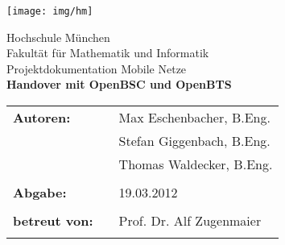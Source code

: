%
\begin{titlepage}
\begin{flushright}
\texttt{[image: img/hm]}%
\end{flushright}

\vspace*{20mm}
\begin{center}
{\Large Hochschule München}\\
{\large Fakultät für Mathematik und Informatik}\\

\vspace*{15mm}
{\huge Projektdokumentation Mobile Netze}\\

\vspace*{10mm}
{\huge \bfseries{Handover mit OpenBSC und OpenBTS}} \\
\vspace*{15mm} 
\end{center}

\vspace*{30mm}

\begin{tabular}{lll}
\textbf{\large {Autoren:}} & & \large {Max Eschenbacher, B.Eng.}\\
			   & & \large {Stefan Giggenbach, B.Eng.}\\
			   & & \large {Thomas Waldecker, B.Eng.}\\
& & \\

\textbf{\large {Abgabe:}} & & \large {19.03.2012}\\
& & \\

\textbf{\large {betreut von:}} & & \large {Prof. Dr. Alf Zugenmaier}\\
& & \\
\end{tabular}

\end{titlepage}

\tableofcontents
\newpage

